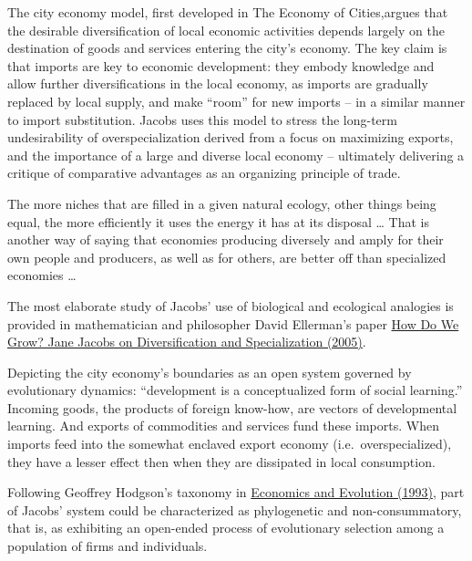 \documentclass[
]{book}
\begin{document}
The city economy model, first developed in The Economy of Cities,argues that the desirable diversification of local economic activities depends largely on the destination of goods and services entering the city's economy. The key claim is that imports are key to economic development: they embody knowledge and allow further diversifications in the local economy, as imports are gradually replaced by local supply, and make ``room'' for new imports -- in a similar manner to import substitution. Jacobs uses this model to stress the long-term undesirability of overspecialization derived from a focus on maximizing exports, and the importance of a large and diverse local economy -- ultimately delivering a critique of comparative advantages as an organizing principle of trade.

The more niches that are filled in a given natural ecology, other things being equal,
the more efficiently it uses the energy it has at its disposal \ldots{}
That is another way of saying that economies producing diversely and amply
for their own people and producers, as well as for others,
are better off than specialized economies \ldots{}

The most elaborate study of Jacobs' use of biological and ecological analogies is provided in mathematician and philosopher David Ellerman's paper \href{http://www.ellerman.org/how-do-we-grow-jane-jacobs-on-diversification-and-specialization/}{How Do We Grow? Jane Jacobs on Diversification and Specialization (2005)}.

Depicting the city economy's boundaries as an open system governed by evolutionary dynamics:
``development is a conceptualized form of social learning.''
Incoming goods, the products of foreign know-how, are vectors of developmental learning.
And exports of commodities and services fund these imports.
When imports feed into the somewhat enclaved export economy (i.e.~overspecialized),
they have a lesser effect then when they are dissipated in local consumption.

Following Geoffrey Hodgson's taxonomy in
\href{https://www.press.umich.edu/14006/economics_and_evolution}{Economics and Evolution (1993)},
part of Jacobs' system could be characterized as phylogenetic and non-consummatory,
that is, as exhibiting an open-ended process of evolutionary selection
among a population of firms and individuals.
\end{document}
